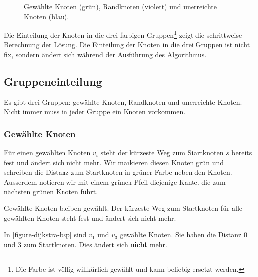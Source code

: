 \begin{figure}[htb]
\caption{Gewählte Knoten (grün), Randknoten (violett) und unerreichte Knoten (blau).}
\label{figure-dijkstra-bsp}
\end{figure}

Die Einteilung der Knoten in die drei farbigen Gruppen\footnote{Die Farbe ist völlig willkürlich gewählt und kann beliebig ersetzt werden.} zeigt die schrittweise Berechnung der Lösung. Die Einteilung der Knoten in die drei Gruppen ist nicht fix, sondern ändert sich während der Ausführung des Algorithmus.

\subsection{Gruppeneinteilung}

Es gibt drei Gruppen: gewählte Knoten, Randknoten und unerreichte Knoten. Nicht immer muss in jeder Gruppe ein Knoten vorkommen.

\subsubsection{Gewählte Knoten}

Für einen gewählten Knoten $v_i$ steht der kürzeste Weg zum Startknoten $s$ bereits fest und ändert sich nicht mehr. Wir markieren diesen Knoten grün und schreiben die Distanz zum Startknoten in grüner Farbe neben den Knoten. Ausserdem notieren wir mit einem grünen Pfeil diejenige Kante, die zum nächsten grünen Knoten führt.

\begin{important}
	Gewählte Knoten bleiben gewählt. Der kürzeste Weg zum Startknoten für alle gewählten Knoten steht fest und ändert sich nicht mehr.
\end{important}

\begin{example}
	In \autoref{figure-dijkstra-bsp} sind $v_1$ und $v_3$ gewählte Knoten. Sie haben die Distanz $0$ und $3$ zum Startknoten. Dies ändert sich \textbf{nicht} mehr.
\end{example}

